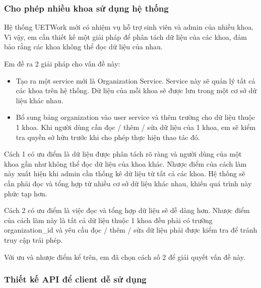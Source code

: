 \documentclass[./../main.tex]{subfiles}
\begin{document}
\hypertarget{cho-phuxe9p-nhiux1ec1u-khoa-sux1eed-dux1ee5ng-hux1ec7-thux1ed1ng}{%
\subsubsection{Cho phép nhiều khoa sử dụng hệ
thống}\label{cho-phuxe9p-nhiux1ec1u-khoa-sux1eed-dux1ee5ng-hux1ec7-thux1ed1ng}}

Hệ thống UETWork mới có nhiệm vụ hỗ trợ sinh viên và admin của nhiều
khoa. Vì vậy, em cần thiết kế một giải pháp để phân tách dữ liệu của các
khoa, đảm bảo rằng các khoa không thể đọc dữ liệu của nhau.

Em đề ra 2 giải pháp cho vấn đề này:

\begin{itemize}
\item
  
  Tạo ra một service mới là Organization Service. Service này sẽ quản lý
  tất cả các khoa trên hệ thống. Dữ liệu của mỗi khoa sẽ được lưu trong
  một cơ sở dữ liệu khác nhau.
  
\item
  
  Bổ sung bảng organization vào user service và thêm trường
   cho dữ liệu thuộc 1 khoa. Khi người dùng cần đọc /
  thêm / sửa dữ liệu của 1 khoa, em sẽ kiểm tra quyền sở hữu trước khi
  cho phép thực hiện thao tác đó.
  
\end{itemize}

Cách 1 có ưu điểm là dữ liệu được phân tách rõ ràng và người dùng của
một khoa gần như không thể đọc dữ liệu của khoa khác. Nhược điểm của
cách làm này xuất hiện khi admin cần thống kê dữ liệu từ tất cả các
khoa. Hệ thống sẽ cần phải đọc và tổng hợp từ nhiều cơ sở dữ liệu khác
nhau, khiến quá trình này phức tạp hơn.

Cách 2 có ưu điểm là việc đọc và tổng hợp dữ liệu sẽ dễ dàng hơn. Nhược
điểm của cách làm này là tất cả dữ liệu thuộc 1 khoa đều phải có trường
organization\_id và yêu cầu đọc / thêm / sửa dữ liệu phải được kiểm tra
để tránh truy cập trái phép.

Với ưu và nhược điểm kể trên, em đã chọn cách số 2 để giải quyết vấn đề
này.

\hypertarget{thiux1ebft-kux1ebf-api-ux111ux1ec3-client-dux1ec5-sux1eed-dux1ee5ng}{%
\subsubsection{Thiết kế API để client dễ sử
dụng}\label{thiux1ebft-kux1ebf-api-ux111ux1ec3-client-dux1ec5-sux1eed-dux1ee5ng}}
\end{document}
